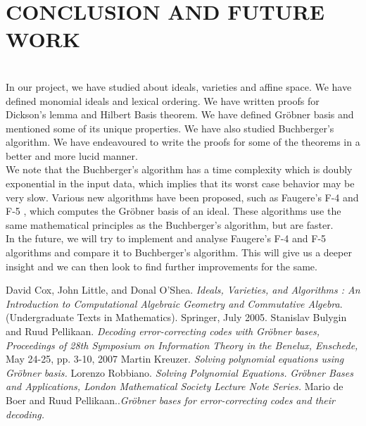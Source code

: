 \documentclass[12pt]{article}
\begin{document}
\section{CONCLUSION AND FUTURE WORK}
\\
\indent \indent \indent In our project, we have studied about ideals, varieties and affine space. We have defined monomial ideals and lexical ordering. We have written proofs for Dickson's lemma and Hilbert Basis theorem. We have defined Gr\"{o}bner basis and mentioned some of its unique properties. We have also studied Buchberger's algorithm. We have endeavoured to write the proofs for some of the theorems in a better and more lucid manner.\\

\indent \indent We note that the Buchberger's algorithm has a time complexity which is doubly exponential in the input data, which implies that its worst case behavior may be very slow. Various new algorithms have been proposed, such as Faugere's F-4 and F-5 , which computes the Gr\"{o}bner basis of an ideal. These algorithms use the same mathematical principles as the Buchberger's algorithm, but are faster.\\

\indent  \indent In the future, we will try to implement and analyse Faugere's F-4 and F-5 algorithms and compare it to Buchberger's algorithm. This will give us a deeper insight and we can then look to find further improvements for the same.\\

 
\newpage
\begin{thebibliography}{99}
	David Cox, John Little, and Donal O’Shea. \textsl{Ideals, Varieties, and
    Algorithms : An Introduction to Computational Algebraic Geometry and
    Commutative Algebra}. (Undergraduate Texts in Mathematics).
    Springer, July 2005.
\bibitem{}
	Stanislav Bulygin and Ruud Pellikaan. \textsl{Decoding error-correcting codes with Gr\"{o}bner bases, Proceedings of 28th Symposium on Information Theory in the Benelux, Enschede,} May 24-25, pp. 3-10, 2007
	Martin Kreuzer. \textsl{Solving polynomial equations using Gr\"{o}bner basis. }
	Lorenzo Robbiano. \textsl{Solving Polynomial Equations.}
	\textsl{Gr\"{o}bner Bases and Applications,  London Mathematical Society Lecture Note Series.}
	Mario de Boer and Ruud Pellikaan..\textsl{Gr\"{o}bner bases for error-correcting codes and their decoding.}

\end{thebibliography}

%
%
\end{document}

